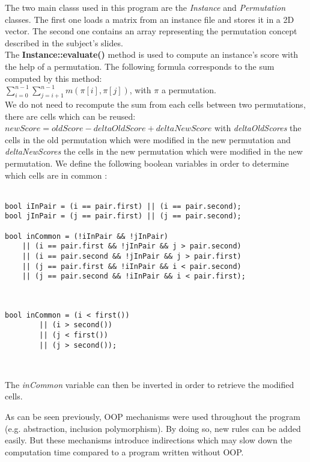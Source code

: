 The two main classs used in this program are the \emph{Instance} and
\emph{Permutation} classes. The first one loads a matrix from an instance file
and stores it in a 2D vector. The second one contains an array representing the
permutation concept described in the subject's slides.\\

The \textbf{Instance::evaluate()} method is used to compute an instance's score
with the help of a permutation. The following formula corresponds to the sum
computed by this method:\\
$\sum_{i=0}^{n-1} \sum_{j=i+1}^{n-1} m(\pi[i], \pi[j])$, with $\pi$ a permutation.\\

We do not need to recompute the sum from each cells between two permutations,
there are cells which can be reused: $newScore = oldScore - deltaOldScore + deltaNewScore$
with \emph{deltaOldScores} the cells in the old permutation which were modified
in the new permutation and \emph{deltaNewScores} the cells in the new permutation
which were modified in the new permutation. We define the following boolean
variables in order to determine which cells are in common :\\\\

\begin{lstlisting}[caption="Cells in common for transpose \& exchange neighbourhoods"]
bool iInPair = (i == pair.first) || (i == pair.second);
bool jInPair = (j == pair.first) || (j == pair.second);

bool inCommon = (!iInPair && !jInPair)
    || (i == pair.first && !jInPair && j > pair.second)
    || (i == pair.second && !jInPair && j > pair.first)
    || (j == pair.first && !iInPair && i < pair.second)
    || (j == pair.second && !iInPair && i < pair.first);
\end{lstlisting}
\

\begin{lstlisting}[caption="Cells in common for insert neighbourhoods"]
    bool inCommon = (i < first())
        || (i > second())
        || (j < first())
        || (j > second());
\end{lstlisting}
\

\noindent The \emph{inCommon} variable can then be inverted in order to retrieve the
modified cells.\\

\begin{framewarning}
	As can be seen previously, OOP mechanisms were used throughout the program
	(e.g. abstraction, inclusion polymorphism). By doing so, new rules can be
	added easily. But these mechanisms introduce indirections which may slow
	down the computation time compared to a program written without OOP.
\end{framewarning}

